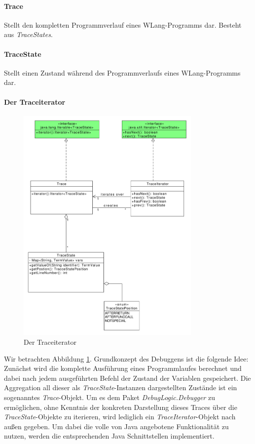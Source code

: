 \documentclass[parskip=full]{scrartcl}
\begin{document}
\paragraph{Trace}
Stellt den kompletten Programmverlauf eines WLang-Programms dar. Besteht aus \textit{TraceStates}.
\paragraph{TraceState}
Stellt einen Zustand während des Programmverlaufs eines WLang-Programms dar.
\paragraph{Der Traceiterator}
\begin{figure}[!h]
\centering
\includegraphics[width=0.8\textwidth]{diagrammIdeenUmlet/TraceIteratorPattern.pdf}
\caption{Der Traceiterator}
\label{TraceIterator}
\end{figure}
Wir betrachten Abbildung \ref{TraceIterator}.
Grundkonzept des Debuggens ist die folgende Idee: Zunächst wird die komplette Ausführung eines Programmlaufes berechnet und dabei nach jedem ausgeführten Befehl der Zustand der Variablen gespeichert. Die Aggregation all dieser als \textit{TraceState}-Instanzen dargestellten Zustände ist ein sogenanntes \textit{Trace}-Objekt. Um es dem Paket \textit{DebugLogic.Debugger} zu ermöglichen, ohne Kenntnis der konkreten Darstellung dieses Traces über die \textit{TraceState}-Objekte zu iterieren, wird lediglich ein \textit{TraceIterator}-Objekt nach außen gegeben. Um dabei die volle von Java angebotene Funktionalität zu nutzen, werden die entsprechenden Java Schnittstellen implementiert. 
\end{document}
